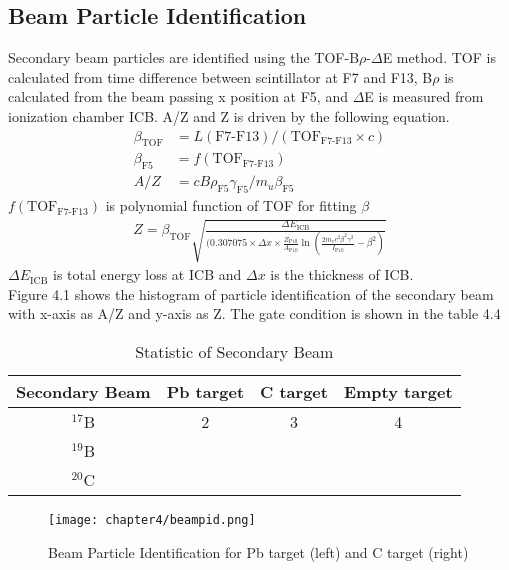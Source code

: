 \subsection{Beam Particle Identification}
Secondary beam particles are identified using the TOF-B$\rho$-$\Delta$E method. TOF is calculated from time difference between scintillator at F7 and F13, B$\rho$ is calculated from the beam passing x position at F5, and $\Delta$E is measured from ionization chamber ICB. A/Z and Z is driven by the following equation.
\begin{align}
    \beta_{\text{TOF}} &= L(\text{F7-F13}) / ( {\text{TOF}}_{\text{F7-F13}} \times c )\\
    \beta_{\text{F5}} &= f(\text{TOF}_{\text{F7-F13}})\\
    A/Z &= c B\rho_{\text{F5}} \gamma_{\text{F5}} / m_u \beta_{\text{F5}}
\end{align}
\indent $f(\text{TOF}_{\text{F7-F13}})$ is polynomial function of TOF for fitting $\beta$
\begin{align}
    Z = \beta_{\text{TOF}} \sqrt{\frac{\Delta E_{\text{ICB}}}{(0.307075 \times \Delta x \times \frac{Z_{\text{P10}}}{A_{\text{P10}}} \ln(\frac{2m_{e}c^{2}\beta^{2}\gamma^{2}}{I_{\text{P10}}} - \beta^{2} )}}
\end{align}
\indent $\Delta E_{\text{ICB}}$ is total energy loss at ICB and $\Delta x$ is the thickness of ICB. \\

Figure 4.1 shows the histogram of particle identification of the secondary beam with x-axis as A/Z and y-axis as Z. The gate condition is shown in the table 4.4 

\begin{table}[h]
    \centering
    \begin{tabular}{cccc}
        \hline
        Secondary Beam & Pb target & C target & Empty target\\             
        \hline \hline
        ${}^{17}$B &  2&3  &4  \\
        ${}^{19}$B &  &  &  \\
        ${}^{20}$C &  &  &  \\
        \hline
    \end{tabular}
    \caption{Statistic of Secondary Beam}
\end{table}

\begin{figure}[t]
    \centering
    \texttt{[image: chapter4/beampid.png]}
    \caption[Secondary Beam Particle Identification]{Beam Particle Identification for Pb target (left) and C target (right)}
    \label{Beam Particle Identification}
\end{figure}

